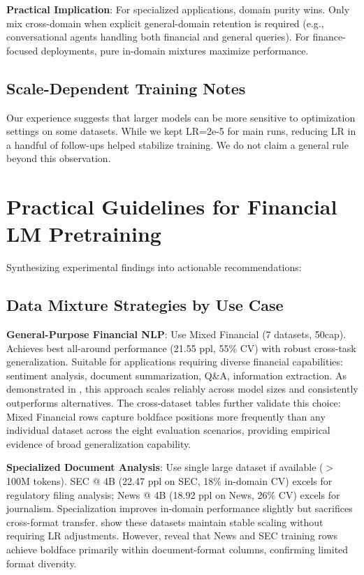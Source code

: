 \textbf{Practical Implication}: For specialized applications, domain purity wins. Only mix cross-domain when explicit general-domain retention is required (e.g., conversational agents handling both financial and general queries). For finance-focused deployments, pure in-domain mixtures maximize performance.

\subsection{Scale-Dependent Training Notes}

Our experience suggests that larger models can be more sensitive to optimization settings on some datasets. While we kept LR=2e-5 for main runs, reducing LR in a handful of follow-ups helped stabilize training. We do not claim a general rule beyond this observation.

\section{Practical Guidelines for Financial LM Pretraining}

Synthesizing experimental findings into actionable recommendations:

\subsection{Data Mixture Strategies by Use Case}

\textbf{General-Purpose Financial NLP}: Use Mixed Financial (7 datasets, 50cap). Achieves best all-around performance (21.55 ppl, 55\% CV) with robust cross-task generalization. Suitable for applications requiring diverse financial capabilities: sentiment analysis, document summarization, Q\&A, information extraction. As demonstrated in , this approach scales reliably across model sizes and consistently outperforms alternatives. The cross-dataset tables further validate this choice: Mixed Financial rows capture boldface positions more frequently than any individual dataset across the eight evaluation scenarios, providing empirical evidence of broad generalization capability.

\textbf{Specialized Document Analysis}: Use single large dataset if available ($>$ 100M tokens). SEC @ 4B (22.47 ppl on SEC, 18\% in-domain CV) excels for regulatory filing analysis; News @ 4B (18.92 ppl on News, 26\% CV) excels for journalism. Specialization improves in-domain performance slightly but sacrifices cross-format transfer.  show these datasets maintain stable scaling without requiring LR adjustments. However,  reveal that News and SEC training rows achieve boldface primarily within document-format columns, confirming limited format diversity.

